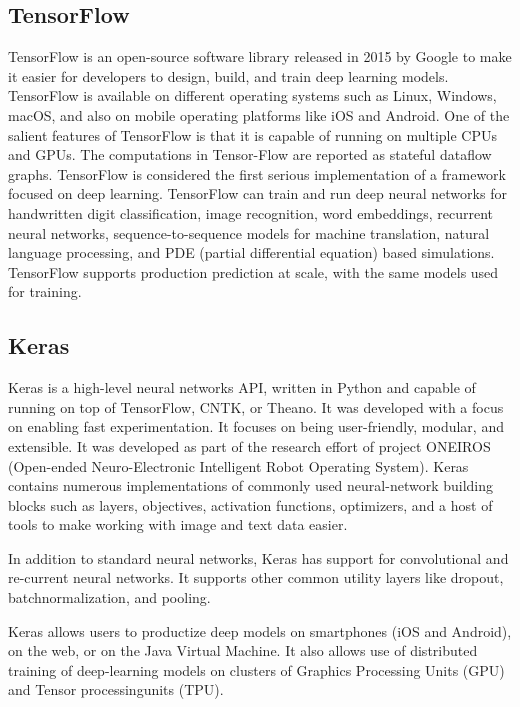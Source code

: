 \subsection{TensorFlow}
TensorFlow is an open-source software library released in 2015 by Google to make it easier for developers to design, build, and train deep learning models. TensorFlow is available on different operating systems such as Linux, Windows, macOS, and also on mobile operating platforms like iOS and Android.  One of the salient features of TensorFlow is that it is capable of running on multiple CPUs and GPUs.  The computations in Tensor-Flow are reported as stateful dataflow graphs. TensorFlow is considered the first serious implementation of a framework focused on deep learning. TensorFlow can train and run deep neural networks for handwritten digit classification, image recognition, word embeddings, recurrent neural networks, sequence-to-sequence models for machine translation, natural language processing, and PDE (partial differential equation) based simulations. TensorFlow supports production prediction at scale, with the same models used for training.

\subsection{Keras}
Keras is a high-level neural networks API, written in Python and capable of running on top of TensorFlow, CNTK, or Theano. It was developed with a focus on enabling fast experimentation. It focuses on being user-friendly, modular, and extensible. It was developed as part of the research effort of project ONEIROS (Open-ended Neuro-Electronic Intelligent Robot Operating System). Keras contains numerous implementations of commonly used neural-network building blocks such as layers, objectives, activation functions, optimizers, and a host of tools to make working with image and text data easier.

In addition to standard neural networks, Keras has support for convolutional and re-current  neural  networks.   It  supports  other  common  utility  layers  like  dropout,  batchnormalization, and pooling.

Keras allows users to productize deep models on smartphones (iOS and Android), on the web, or on the Java Virtual Machine. It also allows use of distributed training of deep-learning models on clusters of Graphics Processing Units (GPU) and Tensor processingunits (TPU).

